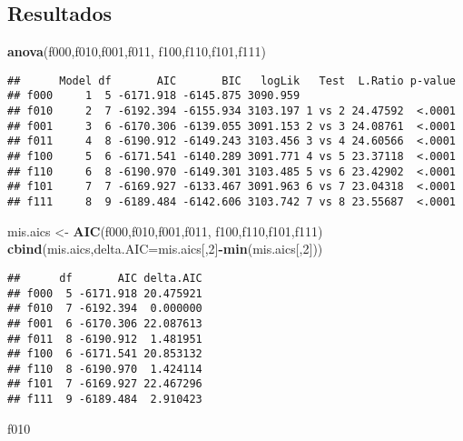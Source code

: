 \documentclass[]{article}
\newenvironment{Shaded}{\begin{snugshade}}{\end{snugshade}}
\newcommand{\DataTypeTok}[1]{\textcolor[rgb]{0.13,0.29,0.53}{#1}}
\newcommand{\DecValTok}[1]{\textcolor[rgb]{0.00,0.00,0.81}{#1}}
\newcommand{\KeywordTok}[1]{\textcolor[rgb]{0.13,0.29,0.53}{\textbf{#1}}}
\newcommand{\NormalTok}[1]{#1}
\newcommand{\OperatorTok}[1]{\textcolor[rgb]{0.81,0.36,0.00}{\textbf{#1}}}
\newcommand{\StringTok}[1]{\textcolor[rgb]{0.31,0.60,0.02}{#1}}
\begin{document}
\hypertarget{resultados}{%
\subsection{Resultados}\label{resultados}}

\begin{Shaded}
\begin{Highlighting}[]
\KeywordTok{anova}\NormalTok{(f000,f010,f001,f011,}
\NormalTok{  f100,f110,f101,f111)}
\end{Highlighting}
\end{Shaded}

\begin{verbatim}
##      Model df       AIC       BIC   logLik   Test  L.Ratio p-value
## f000     1  5 -6171.918 -6145.875 3090.959                        
## f010     2  7 -6192.394 -6155.934 3103.197 1 vs 2 24.47592  <.0001
## f001     3  6 -6170.306 -6139.055 3091.153 2 vs 3 24.08761  <.0001
## f011     4  8 -6190.912 -6149.243 3103.456 3 vs 4 24.60566  <.0001
## f100     5  6 -6171.541 -6140.289 3091.771 4 vs 5 23.37118  <.0001
## f110     6  8 -6190.970 -6149.301 3103.485 5 vs 6 23.42902  <.0001
## f101     7  7 -6169.927 -6133.467 3091.963 6 vs 7 23.04318  <.0001
## f111     8  9 -6189.484 -6142.606 3103.742 7 vs 8 23.55687  <.0001
\end{verbatim}

\begin{Shaded}
\begin{Highlighting}[]
\NormalTok{mis.aics <-}\StringTok{ }\KeywordTok{AIC}\NormalTok{(f000,f010,f001,f011,}
\NormalTok{  f100,f110,f101,f111)}
\KeywordTok{cbind}\NormalTok{(mis.aics,}\DataTypeTok{delta.AIC=}\NormalTok{mis.aics[,}\DecValTok{2}\NormalTok{]}\OperatorTok{-}\KeywordTok{min}\NormalTok{(mis.aics[,}\DecValTok{2}\NormalTok{]))}
\end{Highlighting}
\end{Shaded}

\begin{verbatim}
##      df       AIC delta.AIC
## f000  5 -6171.918 20.475921
## f010  7 -6192.394  0.000000
## f001  6 -6170.306 22.087613
## f011  8 -6190.912  1.481951
## f100  6 -6171.541 20.853132
## f110  8 -6190.970  1.424114
## f101  7 -6169.927 22.467296
## f111  9 -6189.484  2.910423
\end{verbatim}

\begin{Shaded}
\begin{Highlighting}[]
\NormalTok{f010}
\end{Highlighting}
\end{Shaded}
\end{document}
